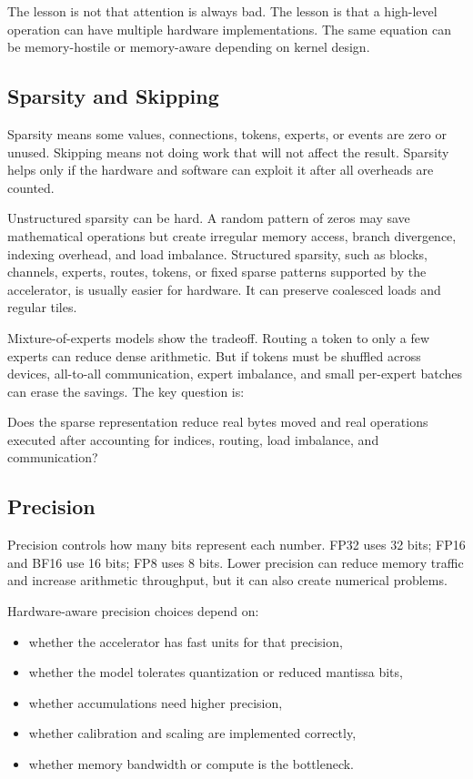 The lesson is not that attention is always bad. The lesson is that a high-level operation can have multiple hardware implementations. The same equation can be memory-hostile or memory-aware depending on kernel design.

\subsection{Sparsity and Skipping}

Sparsity means some values, connections, tokens, experts, or events are zero or unused. Skipping means not doing work that will not affect the result. Sparsity helps only if the hardware and software can exploit it after all overheads are counted.

Unstructured sparsity can be hard. A random pattern of zeros may save mathematical operations but create irregular memory access, branch divergence, indexing overhead, and load imbalance. Structured sparsity, such as blocks, channels, experts, routes, tokens, or fixed sparse patterns supported by the accelerator, is usually easier for hardware. It can preserve coalesced loads and regular tiles.

Mixture-of-experts models show the tradeoff. Routing a token to only a few experts can reduce dense arithmetic. But if tokens must be shuffled across devices, all-to-all communication, expert imbalance, and small per-expert batches can erase the savings. The key question is:

\begin{aside}
Does the sparse representation reduce real bytes moved and real operations executed after accounting for indices, routing, load imbalance, and communication?
\end{aside}

\subsection{Precision}

Precision controls how many bits represent each number. FP32 uses 32 bits; FP16 and BF16 use 16 bits; FP8 uses 8 bits. Lower precision can reduce memory traffic and increase arithmetic throughput, but it can also create numerical problems.

Hardware-aware precision choices depend on:

\begin{itemize}[leftmargin=*]
  \item whether the accelerator has fast units for that precision,
  \item whether the model tolerates quantization or reduced mantissa bits,
  \item whether accumulations need higher precision,
  \item whether calibration and scaling are implemented correctly,
  \item whether memory bandwidth or compute is the bottleneck.
\end{itemize}

